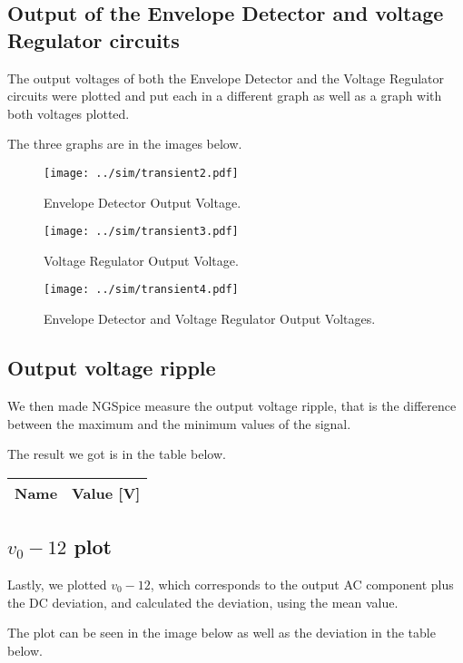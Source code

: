 \subsection{Output of the Envelope Detector and voltage Regulator circuits}
The output voltages of both the Envelope Detector and the Voltage Regulator circuits were plotted and put each in a different graph as well as a graph with both voltages plotted. \par
The three graphs are in the images below.

\begin{figure}[H] \centering
\texttt{[image: ../sim/transient2.pdf]}
\caption{Envelope Detector Output Voltage.}
\label{fig:transient2}
\end{figure}

\begin{figure}[H] \centering
\texttt{[image: ../sim/transient3.pdf]}
\caption{Voltage Regulator Output Voltage.}
\label{fig:transient3}
\end{figure}

\begin{figure}[H] \centering
\texttt{[image: ../sim/transient4.pdf]}
\caption{Envelope Detector and Voltage Regulator Output Voltages.}
\label{fig:transient4}
\end{figure}

\subsection{Output voltage ripple}
We then made NGSpice measure the output voltage ripple, that is the difference between the maximum and the minimum values of the signal. \par
The result we got is in the table below.

\begin{table}[H]
  \centering
  \begin{tabular}{|l|r|}
    \hline    
    {\bf Name} & {\bf Value [V]} \\ \hline
    
  \end{tabular}
  \label{tab:ripple}
\end{table}

\subsection{$v_0 - 12$ plot}
Lastly, we plotted $v_0 - 12$, which corresponds to the output AC component plus the DC deviation, and calculated the deviation, using the mean value. \par
The plot can be seen in the image below as well as the deviation in the table below. \par

